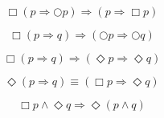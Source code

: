 \documentclass[fleqn, leqno]{article}
\newcommand{\next}{\bigcirc}
\newcommand{\event}{\Diamond}
\newcommand{\always}{\Box}
\newcommand{\spacer}{\vspace{-30pt}}
\begin{document}
\spacer

\begin{equation}\label{E:alwaysImpNext}
\always (p \Rightarrow \next p) \Rightarrow (p \Rightarrow \always p)
\end{equation}

\spacer

\begin{equation}\label{E:alwaysImpNexts}
\always (p \Rightarrow q) \Rightarrow (\next p \Rightarrow \next q)
\end{equation}

\spacer

\begin{equation}\label{E:alwaysImpEvents}
\always (p \Rightarrow q) \Rightarrow (\event p \Rightarrow \event q)
\end{equation}

\spacer

\begin{equation}\label{E:eventImpAlways}
\event (p \Rightarrow q) \equiv (\always p \Rightarrow \event q)
\end{equation}

\spacer

\begin{equation}\label{E:alwaysAndEvent}
\always p \land \event q \Rightarrow \event (p \land q)
\end{equation}
\end{document}
